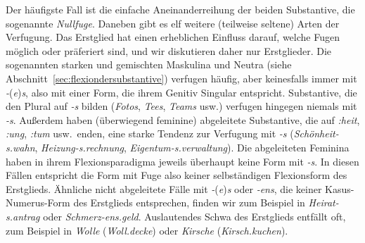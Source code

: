 Der häufigste Fall ist die einfache Aneinanderreihung der beiden Substantive, die sogenannte \textit{Nullfuge}.
Daneben gibt es elf weitere (teilweise seltene) Arten der Verfugung.
Das Erstglied hat einen erheblichen Einfluss darauf, welche Fugen möglich oder präferiert sind, und wir diskutieren daher nur Erstglieder.
Die sogenannten starken und gemischten Maskulina und Neutra (siehe Abschnitt~\ref{sec:flexiondersubstantive}) verfugen häufig, aber keinesfalls immer mit \textit{-}(\textit{e})\textit{s}, also mit einer Form, die ihrem Genitiv Singular entspricht.
Substantive, die den Plural auf \textit{-s} bilden (\textit{Fotos}, \textit{Tees}, \textit{Teams} usw.) verfugen hingegen niemals mit \textit{-s}.
Außerdem haben (überwiegend feminine) abgeleitete Substantive, die auf \textit{:heit}, \textit{:ung}, \textit{:tum} usw.\ enden, eine starke Tendenz zur Verfugung mit \textit{-s} (\zB \textit{Schönheit-s.wahn}, \textit{Heizung-s.rechnung}, \textit{Eigentum-s.verwaltung}).
Die abgeleiteten Feminina haben in ihrem Flexionsparadigma jeweils überhaupt keine Form mit \textit{-s}.
In diesen Fällen entspricht die Form mit Fuge also keiner selbständigen Flexionsform des Erstglieds.
Ähnliche nicht abgeleitete Fälle mit \textit{-}(\textit{e})\textit{s} oder \textit{-ens}, die keiner Kasus-Numerus-Form des Erstglieds entsprechen, finden wir zum Beispiel in \textit{Heirat-s.antrag} oder \textit{Schmerz-ens.geld}.
Auslautendes Schwa des Erstglieds entfällt oft, zum Beispiel in \textit{Wolle} (\textit{Woll.decke}) oder \textit{Kirsche} (\textit{Kirsch.kuchen}).


